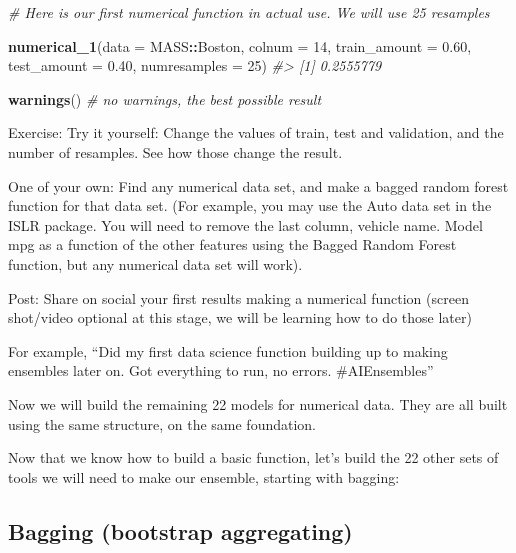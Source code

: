\documentclass[
]{book}
\newenvironment{Shaded}{\begin{snugshade}}{\end{snugshade}}
\newcommand{\AttributeTok}[1]{\textcolor[rgb]{0.13,0.29,0.53}{#1}}
\newcommand{\CommentTok}[1]{\textcolor[rgb]{0.56,0.35,0.01}{\textit{#1}}}
\newcommand{\DecValTok}[1]{\textcolor[rgb]{0.00,0.00,0.81}{#1}}
\newcommand{\FloatTok}[1]{\textcolor[rgb]{0.00,0.00,0.81}{#1}}
\newcommand{\FunctionTok}[1]{\textcolor[rgb]{0.13,0.29,0.53}{\textbf{#1}}}
\newcommand{\NormalTok}[1]{#1}
\newcommand{\SpecialCharTok}[1]{\textcolor[rgb]{0.81,0.36,0.00}{\textbf{#1}}}
\begin{document}
\begin{Shaded}
\begin{Highlighting}[]
\CommentTok{\# Here is our first numerical function in actual use. We will use 25 resamples}

\FunctionTok{numerical\_1}\NormalTok{(}\AttributeTok{data =}\NormalTok{ MASS}\SpecialCharTok{::}\NormalTok{Boston, }\AttributeTok{colnum =} \DecValTok{14}\NormalTok{, }\AttributeTok{train\_amount =} \FloatTok{0.60}\NormalTok{, }\AttributeTok{test\_amount =} \FloatTok{0.40}\NormalTok{, }\AttributeTok{numresamples =} \DecValTok{25}\NormalTok{)}
\CommentTok{\#\textgreater{} [1] 0.2555779}
\end{Highlighting}
\end{Shaded}

\begin{Shaded}
\begin{Highlighting}[]
\FunctionTok{warnings}\NormalTok{() }\CommentTok{\# no warnings, the best possible result}
\end{Highlighting}
\end{Shaded}

Exercise: Try it yourself: Change the values of train, test and
validation, and the number of resamples. See how those change the
result.

One of your own: Find any numerical data set, and make a bagged random
forest function for that data set. (For example, you may use the Auto
data set in the ISLR package. You will need to remove the last column,
vehicle name. Model mpg as a function of the other features using the
Bagged Random Forest function, but any numerical data set will work).

Post: Share on social your first results making a numerical function
(screen shot/video optional at this stage, we will be learning how to do
those later)

For example, ``Did my first data science function building up to making
ensembles later on. Got everything to run, no errors. \#AIEnsembles''

Now we will build the remaining 22 models for numerical data. They are
all built using the same structure, on the same foundation.

Now that we know how to build a basic function, let's build the 22 other
sets of tools we will need to make our ensemble, starting with bagging:

\subsection{Bagging (bootstrap aggregating)}\label{bagging-bootstrap-aggregating}
\end{document}
